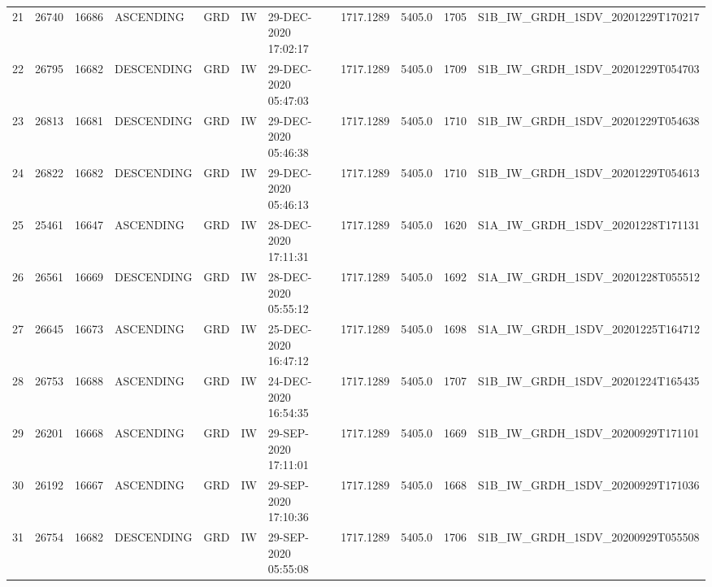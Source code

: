 \begin{tabular}{lrrllllllll}
21  &  26740 &   16686 &   ASCENDING &          GRD &              IW &  29-DEC-2020 17:02:17 &                  1717.1289 &          5405.0 &       1705 &  S1B\_IW\_GRDH\_1SDV\_20201229T170217 \\
22  &  26795 &   16682 &  DESCENDING &          GRD &              IW &  29-DEC-2020 05:47:03 &                  1717.1289 &          5405.0 &       1709 &  S1B\_IW\_GRDH\_1SDV\_20201229T054703 \\
23  &  26813 &   16681 &  DESCENDING &          GRD &              IW &  29-DEC-2020 05:46:38 &                  1717.1289 &          5405.0 &       1710 &  S1B\_IW\_GRDH\_1SDV\_20201229T054638 \\
24  &  26822 &   16682 &  DESCENDING &          GRD &              IW &  29-DEC-2020 05:46:13 &                  1717.1289 &          5405.0 &       1710 &  S1B\_IW\_GRDH\_1SDV\_20201229T054613 \\
25  &  25461 &   16647 &   ASCENDING &          GRD &              IW &  28-DEC-2020 17:11:31 &                  1717.1289 &          5405.0 &       1620 &  S1A\_IW\_GRDH\_1SDV\_20201228T171131 \\
26  &  26561 &   16669 &  DESCENDING &          GRD &              IW &  28-DEC-2020 05:55:12 &                  1717.1289 &          5405.0 &       1692 &  S1A\_IW\_GRDH\_1SDV\_20201228T055512 \\
27  &  26645 &   16673 &   ASCENDING &          GRD &              IW &  25-DEC-2020 16:47:12 &                  1717.1289 &          5405.0 &       1698 &  S1A\_IW\_GRDH\_1SDV\_20201225T164712 \\
28  &  26753 &   16688 &   ASCENDING &          GRD &              IW &  24-DEC-2020 16:54:35 &                  1717.1289 &          5405.0 &       1707 &  S1B\_IW\_GRDH\_1SDV\_20201224T165435 \\
29  &  26201 &   16668 &   ASCENDING &          GRD &              IW &  29-SEP-2020 17:11:01 &                  1717.1289 &          5405.0 &       1669 &  S1B\_IW\_GRDH\_1SDV\_20200929T171101 \\
30  &  26192 &   16667 &   ASCENDING &          GRD &              IW &  29-SEP-2020 17:10:36 &                  1717.1289 &          5405.0 &       1668 &  S1B\_IW\_GRDH\_1SDV\_20200929T171036 \\
31  &  26754 &   16682 &  DESCENDING &          GRD &              IW &  29-SEP-2020 05:55:08 &                  1717.1289 &          5405.0 &       1706 &  S1B\_IW\_GRDH\_1SDV\_20200929T055508 \\

\end{tabular}
